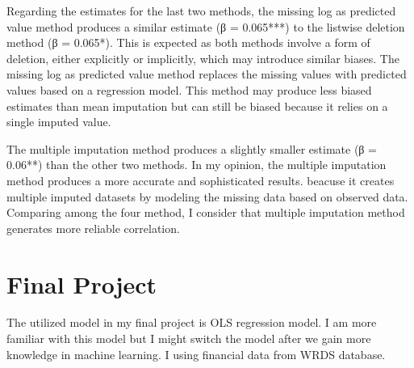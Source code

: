 \documentclass{article}
\begin{document}
Regarding the estimates for the last two methods, the missing log as predicted value method produces a similar estimate (β = 0.065***) to the listwise deletion method (β = 0.065*). This is expected as both methods involve a form of deletion, either explicitly or implicitly, which may introduce similar biases. The missing log as predicted value method replaces the missing values with predicted values based on a regression model. This method may produce less biased estimates than mean imputation but can still be biased because it relies on a single imputed value.

The multiple imputation method produces a slightly smaller estimate (β = 0.06**) than the other two methods. In my opinion, the multiple imputation method produces a more accurate and sophisticated results. beacuse it creates multiple imputed datasets by modeling the missing data based on observed data. Comparing among the four method, I consider that multiple imputation method generates more reliable correlation.


\section{Final Project}
The utilized model in my final project is OLS regression model. I am more familiar with this model but I might switch the model after we gain more knowledge in machine learning. I using financial data from WRDS database.
\end{document}
